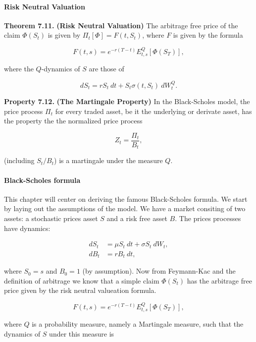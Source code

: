 \documentclass[
]{article}
\begin{document}
\hypertarget{risk-neutral-valuation-1}{%
\paragraph{Risk Neutral Valuation}\label{risk-neutral-valuation-1}}

\textbf{Theorem 7.11.} \textbf{(Risk Neutral Valuation)} The arbitrage
free price of the claim \(\Phi(S_t)\) is given by
\(\Pi_t[\Phi]=F(t,S_t)\), where \(F\) is given by the formula

\[
F(t,s)=e^{-r(T-t)}E^Q_{t,s}[\Phi(S_T)],
\]

where the \(Q\)-dynamics of \(S\) are those of

\[
dS_t=rS_t\ dt+S_t\sigma(t,S_t)\ dW_t^Q.
\]

\textbf{Property 7.12.} \textbf{(The Martingale Property)} In the
Black-Scholes model, the price process \(\Pi_t\) for every traded asset,
be it the underlying or derivate asset, has the property the the
normalized price process

\[
Z_t=\frac{\Pi_t}{B_t},
\]

(including \(S_t/B_t\)) is a martingale under the measure \(Q\).

\hypertarget{black-scholes-formula}{%
\paragraph{Black-Scholes formula}\label{black-scholes-formula}}

This chapter will center on deriving the famous Black-Scholes formula.
We start by laying out the assumptions of the model. We have a market
consiting of two assets: a stochastic prices asset \(S\) and a risk free
asset \(B\). The prices processes have dynamics:

\begin{align*}
dS_t&=\mu S_t\ dt+\sigma S_t\ dW_t,\\
dB_t&=r B_t\ dt,
\end{align*}

where \(S_0=s\) and \(B_0=1\) (by assumption). Now from Feymann-Kac and
the definition of arbitrage we know that a simple claim \(\Phi(S_t)\)
has the arbitrage free price given by the risk neutral valueation
formula.

\[
F(t,s)=e^{-r(T-t)}E^Q_{t,s}[\Phi(S_T)],
\]

where \(Q\) is a probability measure, namely a Martingale measure, such
that the dynamics of \(S\) under this measure is
\end{document}
